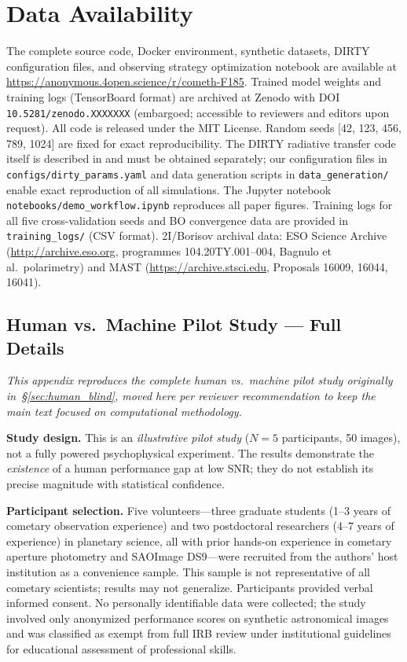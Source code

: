 \documentclass[usenatbib]{mnras}
\begin{document}
\section*{Data Availability}
The complete source code, Docker environment, synthetic datasets, DIRTY configuration files, and observing strategy optimization notebook are available at \url{https://anonymous.4open.science/r/cometh-F185}. Trained model weights and training logs (TensorBoard format) are archived at Zenodo with DOI \texttt{10.5281/zenodo.XXXXXXX} (embargoed; accessible to reviewers and editors upon request). All code is released under the MIT License. Random seeds [42, 123, 456, 789, 1024] are fixed for exact reproducibility. The DIRTY radiative transfer code itself is described in \citet{gordon01} and must be obtained separately; our configuration files in {\tt configs/dirty\_params.yaml} and data generation scripts in {\tt data\_generation/} enable exact reproduction of all simulations. The Jupyter notebook {\tt notebooks/demo\_workflow.ipynb} reproduces all paper figures. Training logs for all five cross-validation seeds and BO convergence data are provided in {\tt training\_logs/} (CSV format). 2I/Borisov archival data: ESO Science Archive (\url{http://archive.eso.org}, programmes 104.20TY.001--004, Bagnulo et al.\ polarimetry) and MAST (\url{https://archive.stsci.edu}, Proposals 16009, 16044, 16041).




\subsection{Human vs.\ Machine Pilot Study --- Full Details}\label{app:human_blind}

\textit{This appendix reproduces the complete human vs.\ machine pilot study originally in~\S\ref{sec:human_blind}, moved here per reviewer recommendation to keep the main text focused on computational methodology.}

\textbf{Study design.} This is an \textit{illustrative pilot study} ($N=5$ participants, 50 images), not a fully powered psychophysical experiment. The results demonstrate the \textit{existence} of a human performance gap at low SNR; they do not establish its precise magnitude with statistical confidence.

\textbf{Participant selection.} Five volunteers---three graduate students (1--3 years of cometary observation experience) and two postdoctoral researchers (4--7 years of experience) in planetary science, all with prior hands-on experience in cometary aperture photometry and SAOImage DS9---were recruited from the authors' host institution as a convenience sample. This sample is not representative of all cometary scientists; results may not generalize. Participants provided verbal informed consent. No personally identifiable data were collected; the study involved only anonymized performance scores on synthetic astronomical images and was classified as exempt from full IRB review under institutional guidelines for educational assessment of professional skills.
\end{document}

